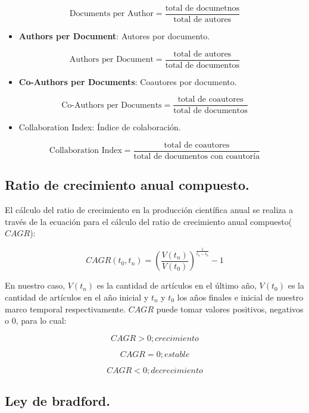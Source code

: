 \documentclass[
]{article}
\providecommand{\tightlist}{%
  \setlength{\itemsep}{0pt}\setlength{\parskip}{0pt}}
\begin{document}
\[
\text{Documents per Author}=\frac{\text{total de documetnos}}{\text{total de autores}}
\]

\begin{itemize}
\tightlist
\item
  \textbf{Authors per Document}: Autores por documento.
\end{itemize}

\[
\text{Authors per Document}=\frac{\text{total de autores}}{\text{total de documentos}}
\]

\begin{itemize}
\tightlist
\item
  \textbf{Co-Authors per Documents}: Coautores por documento.
\end{itemize}

\[
\text{Co-Authors per Documents}=\frac{\text{total de coautores}}{\text{total de documentos}}
\]

\begin{itemize}
\tightlist
\item
  Collaboration Index: Índice de colaboración.
\end{itemize}

\[
\text{Collaboration Index}=\frac{\text{total de coautores}}{\text{total de documentos con coautoría}}
\]

\hypertarget{ratio-de-crecimiento-anual-compuesto.}{%
\subsection{Ratio de crecimiento anual
compuesto.}\label{ratio-de-crecimiento-anual-compuesto.}}

El cálculo del ratio de crecimiento en la producción científica anual se
realiza a través de la ecuación para el cálculo del ratio de crecimiento
anual compuesto(\(CAGR\)):

\[
CAGR(t_0, t_n)=\left({\frac{V(t_n)}{V(t_0)}}\right)^{\frac{1}{t_n-t_0}}-1
\]

En nuestro caso, \(V(t_n)\) es la cantidad de artículos en el último
año, \(V(t_0)\) es la cantidad de artículos en el año inicial y \(t_n\)
y \(t_0\) los años finales e inicial de nuestro marco temporal
respectivamente. \(CAGR\) puede tomar valores positivos, negativos o 0,
para lo cual:

\[
CAGR>0; crecimiento
\]

\[
CAGR=0; estable
\]

\[
CAGR<0; decrecimiento
\]

\hypertarget{ley-de-bradford.-1}{%
\subsection{Ley de bradford.}\label{ley-de-bradford.-1}}
\end{document}
